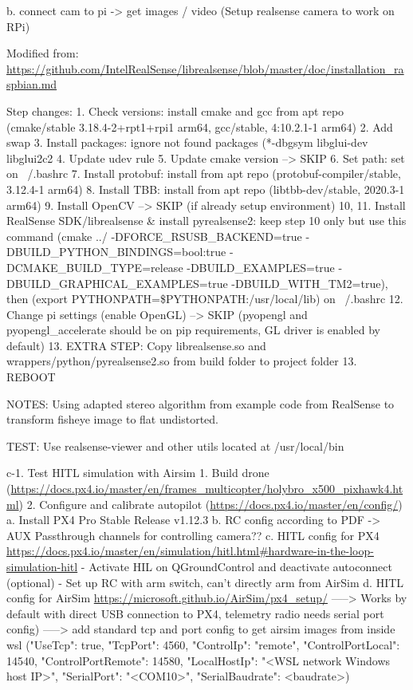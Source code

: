     b. connect cam to pi -> get images / video (Setup realsense camera to work on RPi)
        
        Modified from:
        \url{https://github.com/IntelRealSense/librealsense/blob/master/doc/installation_raspbian.md}
        
        Step changes:
        1. Check versions: install cmake and gcc from apt repo (cmake/stable 3.18.4-2+rpt1+rpi1 arm64, gcc/stable, 4:10.2.1-1 arm64)
        2. Add swap
        3. Install packages: ignore not found packages (*-dbgsym libglui-dev libglui2c2
        4. Update udev rule
        5. Update cmake version --> SKIP
        6. Set path: set on ~/.bashrc
        7. Install protobuf: install from apt repo (protobuf-compiler/stable, 3.12.4-1 arm64)
        8. Install TBB: install from apt repo (libtbb-dev/stable, 2020.3-1 arm64)
        9. Install OpenCV --> SKIP (if already setup environment)
        10, 11. Install RealSense SDK/librealsense & install pyrealsense2: keep step 10 only but use this command (cmake ../ -DFORCE_RSUSB_BACKEND=true -DBUILD_PYTHON_BINDINGS=bool:true -DCMAKE_BUILD_TYPE=release -DBUILD_EXAMPLES=true -DBUILD_GRAPHICAL_EXAMPLES=true  -DBUILD_WITH_TM2=true), then (export PYTHONPATH=\$PYTHONPATH:/usr/local/lib) on ~/.bashrc
        12. Change pi settings (enable OpenGL) --> SKIP (pyopengl and pyopengl_accelerate should be on pip requirements, GL driver is enabled by default)
        13. EXTRA STEP: Copy librealsense.so and wrappers/python/pyrealsense2.so from build folder to project folder
        13. REBOOT
        
        NOTES: Using adapted stereo algorithm from example code from RealSense to transform fisheye image to flat undistorted.
        
        TEST: Use realsense-viewer and other utils located at /usr/local/bin

    c-1. Test HITL simulation with Airsim    
        1. Build drone (\url{https://docs.px4.io/master/en/frames_multicopter/holybro_x500_pixhawk4.html})
        2. Configure and calibrate autopilot (\url{https://docs.px4.io/master/en/config/})
            a. Install PX4 Pro Stable Release v1.12.3
            b. RC config according to PDF -> AUX Passthrough channels for controlling camera??
            c. HITL config for PX4 \url{https://docs.px4.io/master/en/simulation/hitl.html#hardware-in-the-loop-simulation-hitl}
                - Activate HIL on QGroundControl and deactivate autoconnect (optional)
                - Set up RC with arm switch, can't directly arm from AirSim
            d. HITL config for AirSim \url{https://microsoft.github.io/AirSim/px4_setup/}
            -----> Works by default with direct USB connection to PX4, telemetry radio needs serial port config)
            -----> add standard tcp and port config to get airsim images from inside wsl
                ("UseTcp": true,
                "TcpPort": 4560,
                "ControlIp": "remote",
                "ControlPortLocal": 14540,
                "ControlPortRemote": 14580,
                "LocalHostIp": "<WSL network Windows host IP>",
                "SerialPort": "<COM10>",
                "SerialBaudrate": <baudrate>)
                
